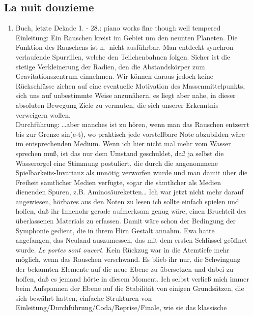 \documentclass[
]{article}
\author{}
\date{\vspace{-2.5em}}
\providecommand{\tightlist}{%
  \setlength{\itemsep}{0pt}\setlength{\parskip}{0pt}}
\begin{document}
\subsection{La nuit douzieme}\label{la-nuit-douzieme}

\begin{enumerate}
\def\labelenumi{\arabic{enumi}.}
\setcounter{enumi}{2}
\tightlist
\item
  Buch, letzte Dekade 1. - 28.: piano works fine though well tempered\\
  Einleitung: Ein Rauschen kreist im Gebiet um den neunten Planeten. Die
  Funktion des Rauschens ist n.~nicht ausführbar. Man entdeckt synchron
  verlaufende Spurrillen, welche den Teilchenbahnen folgen. Sicher ist
  die stetige Verkleinerung der Radien, den die Abstandskörper zum
  Gravitationszentrum einnehmen. Wir können daraus jedoch keine
  Rückschlüsse ziehen auf eine eventuelle Motivation des
  Massenmittelpunkts, sich uns auf unbestimmte Weise anzunähern, es
  liegt aber nahe, in dieser absoluten Bewegung Ziele zu vermuten, die
  sich unserer Erkenntnis verweigern wollen.\\
  Durchführung: \ldots aber manches ist zu hören, wenn man das Rauschen
  entzerrt bis zur Grenze sin(e-t), wo praktisch jede vorstellbare Note
  abzubilden wäre im entsprechenden Medium. Wenn ich hier nicht mal mehr
  vom Wasser sprechen muß, ist das nur dem Umstand geschuldet, daß ja
  selbst die Wasserorgel eine Stimmung postuliert, die durch die
  angenommene Spielbarkeits-Invarianz als unnötig verworfen wurde und
  man damit über die Freiheit sämtlicher Medien verfügte, sogar die
  sämtlicher als Medien dienenden Spuren, z.B. Aminosäureketten\ldots{}
  Ich war jetzt nicht mehr darauf angewiesen, hörbares aus den Noten zu
  lesen ich sollte einfach spielen und hoffen, daß ihr Innenohr gerade
  aufmerksam genug wäre, einen Bruchteil des überlassenen Materials zu
  erfassen. Damit wäre schon der Bedingung der Symphonie gedient, die in
  ihrem Hirn Gestalt annahm. Ewa hatte angefangen, das Neuland
  auszumessen, das mit dem ersten Schlüssel geöffnet wurde. \emph{Le
  portes sont ouvert. }Kein Rückzug war in die Atemtiefe mehr möglich,
  wenn das Rauschen verschwand. Es blieb ihr nur, die Schwingung der
  bekannten Elemente auf die neue Ebene zu übersetzen und dabei zu
  hoffen, daß es jemand hörte in diesem Moment. Ich selbst verließ mich
  immer beim Aufspannen der Ebene auf die Stabilität von einigen
  Grundsätzen, die sich bewährt hatten, einfache Strukturen von
  Einleitung/Durchführung/Coda/Reprise/Finale, wie sie das klassische

\end{enumerate}
\end{document}

